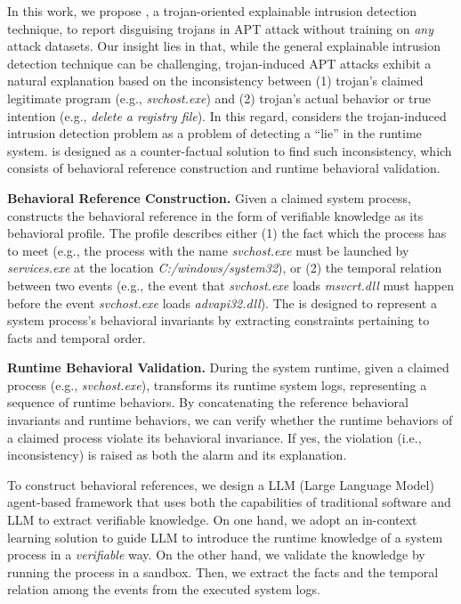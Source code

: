 In this work, we propose \tool,
a trojan-oriented explainable intrusion detection technique,
to report disguising trojans in APT attack without training on \textit{any} attack datasets.
Our insight lies in that,
while the general explainable intrusion detection technique can be challenging,
trojan-induced APT attacks exhibit a natural explanation based on
the inconsistency between 
(1) trojan's claimed legitimate program (e.g., \textit{svchost.exe}) and
(2) trojan's actual behavior or true intention (e.g., \textit{delete a registry file}).
In this regard, 
\tool considers the trojan-induced intrusion detection problem as a problem of
detecting a ``lie'' in the runtime system.
\tool is designed as a counter-factual solution to find such inconsistency,
which consists of 
behavioral reference construction and
runtime behavioral validation.

\noindent\textbf{Behavioral Reference Construction.}
Given a claimed system process, \tool constructs the behavioral reference in the form of 
verifiable knowledge as its behavioral profile.
The profile describes either
(1) the fact which the process has to meet (e.g., the process with the name \textit{svchost.exe} must be launched by \textit{services.exe} at the location \textit{C:/windows/system32}), or
(2) the temporal relation between two events 
(e.g., the event that \textit{svchost.exe} loads \textit{msvcrt.dll} must happen before the event \textit{svchost.exe} loads \textit{advapi32.dll}).
The \tool is designed to represent a system process's behavioral invariants by extracting constraints pertaining to facts and temporal order.

\noindent\textbf{Runtime Behavioral Validation.}
During the system runtime,
given a claimed process (e.g., \textit{svchost.exe}),
\tool transforms its runtime system logs, representing a sequence of runtime behaviors.
By concatenating the reference behavioral invariants and runtime behaviors,
we can verify whether the runtime behaviors of a claimed process violate its behavioral invariance.
If yes, the violation (i.e., inconsistency) is raised as both the alarm and its explanation.

To construct behavioral references, we design a LLM (Large Language Model) agent-based framework that uses both the capabilities of traditional software and LLM to extract verifiable knowledge.
On one hand, 
we adopt an in-context learning solution to guide LLM to 
introduce the runtime knowledge of a system process in a \textit{verifiable} way.
On the other hand,
we validate the knowledge by running the process in a sandbox.
Then, we extract the facts and the temporal relation among the events from the executed system logs.

